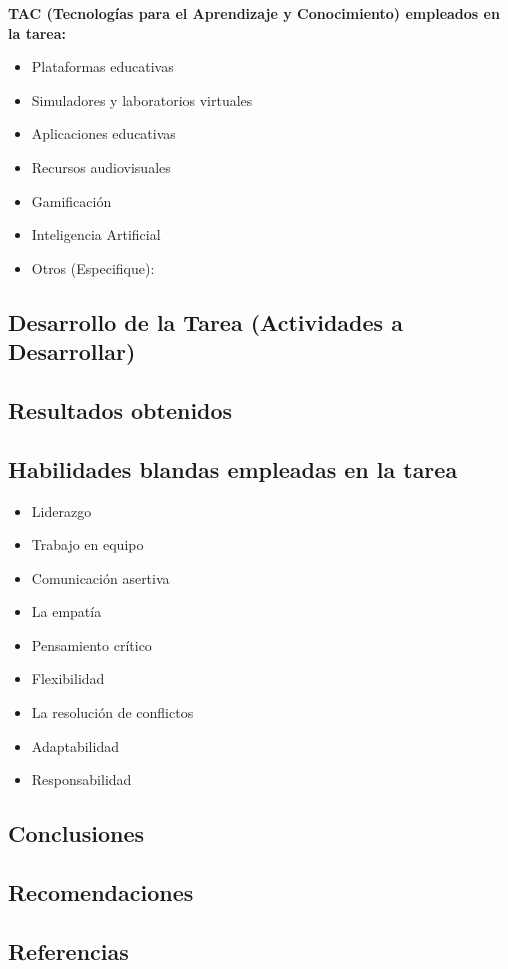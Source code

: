 \documentclass{article}
\begin{document}
\textbf{TAC (Tecnologías para el Aprendizaje y Conocimiento) empleados en la tarea:}
\begin{itemize}
    \item[$\checkmark$] Plataformas educativas
    \item[$\square$] Simuladores y laboratorios virtuales
    \item[$\square$] Aplicaciones educativas
    \item[$\square$] Recursos audiovisuales
    \item[$\square$] Gamificación
    \item[$\checkmark$] Inteligencia Artificial
    \item Otros (Especifique): \underline{\hspace{5cm}}
\end{itemize}


\subsection{Desarrollo de la Tarea (Actividades a Desarrollar)}

\subsection{Resultados obtenidos}


\subsection{Habilidades blandas empleadas en la tarea}
\begin{itemize}
    \item[$\square$] Liderazgo
    \item[$\square$] Trabajo en equipo
    \item[$\square$] Comunicación asertiva
    \item[$\square$] La empatía
    \item[$\checkmark$] Pensamiento crítico
    \item[$\square$] Flexibilidad
    \item[$\checkmark$] La resolución de conflictos
    \item[$\square$] Adaptabilidad
    \item[$\checkmark$] Responsabilidad
\end{itemize}



\subsection{Conclusiones}

\subsection{Recomendaciones}

\subsection{Referencias}


\vspace{-3em} %
\renewcommand{\refname}{}


\end{document}
